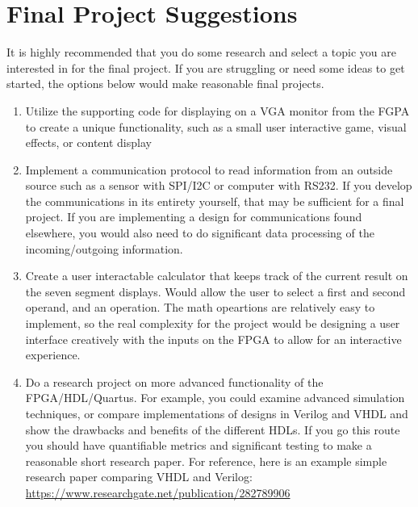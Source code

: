 \documentclass{article}
\begin{document}
\section*{Final Project Suggestions}
\color{black}
It is highly recommended that you do some research and select a topic you are interested in for the final project. If you are struggling or need some ideas to get started, the options below would make reasonable final projects.
\begin{enumerate}
    \item Utilize the supporting code for displaying on a VGA monitor from the FGPA to create a unique functionality, such as a small user interactive game, visual effects, or content display
    \item Implement a communication protocol to read information from an outside source such as a sensor with SPI/I2C or computer with RS232. If you develop the communications in its entirety yourself, that may be sufficient for a final project. If you are implementing a design for communications found elsewhere, you would also need to do significant data processing of the incoming/outgoing information.
    \item Create a user interactable calculator that keeps track of the current result on the seven segment displays. Would allow the user to select a first and second operand, and an operation. The math opeartions are relatively easy to implement, so the real complexity for the project would be designing a user interface creatively with the inputs on the FPGA to allow for an interactive experience.
    \item Do a research project on more advanced functionality of the FPGA/HDL/Quartus. For example, you could examine advanced simulation techniques, or compare implementations of designs in Verilog and VHDL and show the drawbacks and benefits of the different HDLs. If you go this route you should have quantifiable metrics and significant testing to make a reasonable short research paper. For reference, here is an example simple research paper comparing VHDL and Verilog: \url{https://www.researchgate.net/publication/282789906}
\end{enumerate}
\end{document}
